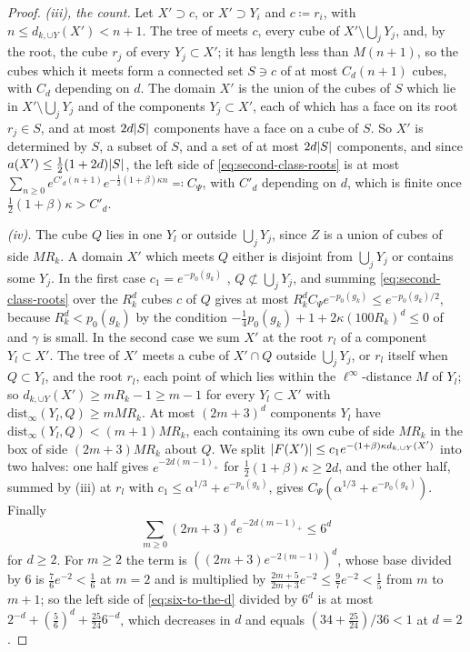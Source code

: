 \documentclass[11pt]{preprint}
\DeclarePairedDelimiter{\abs}{\lvert}{\rvert}
\numberwithin{equation}{section}
\theoremstyle{definition}
\theoremstyle{remark}
\theoremstyle{plain}
\begin{document}
\begin{proof}
\emph{(iii), the count.} Let $X' \supset c$, or $X' \supset Y_i$ and $c \coloneqq r_i$, with $n \leq d_{k,\cup Y}(X') < n + 1$. The tree of \cite[(1.67)]{BalabanLFR2} meets $c$, every cube of $X' \setminus \bigcup_jY_j$, and, by the root, the cube $r_j$ of every $Y_j \subset X'$; it has length less than $M(n + 1)$, so the cubes which it meets form a connected set $S \ni c$ of at most $C_d(n + 1)$ cubes, with $C_d$ depending on $d$. The domain $X'$ is the union of the cubes of $S$ which lie in $X' \setminus \bigcup_jY_j$ and of the components $Y_j \subset X'$, each of which has a face on its root $r_j \in S$, and at most $2d\abs S$ components have a face on a cube of $S$. So $X'$ is determined by $S$, a subset of $S$, and a set of at most $2d\abs S$ components, and since $a(X') \leq \frac12(1 + 2d)\abs S$, the left side of \eqref{eq:second-class-roots} is at most $\sum_{n \geq 0}e^{C'_d(n+1)}e^{-\frac12(1+\beta)\kappa n} \eqqcolon C_\Psi$, with $C'_d$ depending on $d$, which is finite once $\frac12(1 + \beta)\kappa > C'_d$.

\emph{(iv).} The cube $Q$ lies in one $Y_l$ or outside $\bigcup_jY_j$, since $Z$ is a union of cubes of side $MR_k$. A domain $X'$ which meets $Q$ either is disjoint from $\bigcup_jY_j$ or contains some $Y_j$. In the first case $c_1 = e^{-p_0(g_k)}$ \cite[(1.97)]{BalabanLFR2}, $Q \not\subset \bigcup_jY_j$, and summing \eqref{eq:second-class-roots} over the $R_k^d$ cubes $c$ of $Q$ gives at most $R_k^dC_\Psi e^{-p_0(g_k)} \leq e^{-p_0(g_k)/2}$, because $R_k^d < p_0(g_k)$ by the condition $-\frac14p_0(g_k) + 1 + 2\kappa(100R_k)^d \leq 0$ of \cite[p.~389, ll.~16--18]{BalabanLFR2} and $\gamma$ is small. In the second case we sum $X'$ at the root $r_l$ of a component $Y_l \subset X'$. The tree of $X'$ meets a cube of $X' \cap Q$ outside $\bigcup_jY_j$, or $r_l$ itself when $Q \subset Y_l$, and the root $r_l$, each point of which lies within the $\ell^\infty$-distance $M$ of $Y_l$; so $d_{k,\cup Y}(X') \geq mR_k - 1 \geq m - 1$ for every $Y_l \subset X'$ with $\mathrm{dist}_\infty(Y_l, Q) \geq mMR_k$. At most $(2m + 3)^d$ components $Y_l$ have $\mathrm{dist}_\infty(Y_l, Q) < (m + 1)MR_k$, each containing its own cube of side $MR_k$ in the box of side $(2m + 3)MR_k$ about $Q$. We split $\abs{F(X')} \leq c_1e^{-(1+\beta)\kappa d_{k,\cup Y}(X')}$ into two halves: one half gives $e^{-2d(m-1)_+}$ for $\frac12(1 + \beta)\kappa \geq 2d$, and the other half, summed by (iii) at $r_l$ with $c_1 \leq \alpha^{1/3} + e^{-p_0(g_k)}$, gives $C_\Psi(\alpha^{1/3} + e^{-p_0(g_k)})$. Finally
\begin{equation}\label{eq:six-to-the-d}
    \sum_{m \geq 0}(2m + 3)^de^{-2d(m-1)_+} \leq 6^d
\end{equation}
for $d \geq 2$. For $m \geq 2$ the term is $((2m + 3)e^{-2(m-1)})^d$, whose base divided by $6$ is $\frac76e^{-2} < \frac16$ at $m = 2$ and is multiplied by $\frac{2m+5}{2m+3}e^{-2} \leq \frac97e^{-2} < \frac15$ from $m$ to $m + 1$; so the left side of \eqref{eq:six-to-the-d} divided by $6^d$ is at most $2^{-d} + (\frac56)^d + \frac{25}{24}6^{-d}$, which decreases in $d$ and equals $(34 + \frac{25}{24})/36 < 1$ at $d = 2$.


\end{proof}
\end{document}
